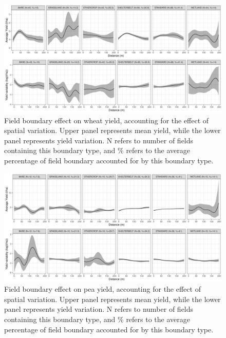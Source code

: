 \documentclass[]{elsarticle} %
\begin{document}
\begin{figure}
\includegraphics[width=1\linewidth]{ModelSummary3a_wheat} \caption{Field boundary effect on wheat yield, accounting for the effect of spatial variation. Upper panel represents mean yield, while the lower panel represents yield variation. N refers to number of fields containing this boundary type, and \% refers to the average percentage of field boundary accounted for by this boundary type.}
\end{figure}

\newpage

\begin{figure}
\includegraphics[width=1\linewidth]{ModelSummary3a_peas} \caption{Field boundary effect on pea yield, accounting for the effect of spatial variation. Upper panel represents mean yield, while the lower panel represents yield variation. N refers to number of fields containing this boundary type, and \% refers to the average percentage of field boundary accounted for by this boundary type.}
\end{figure}

\newpage
\end{document}

